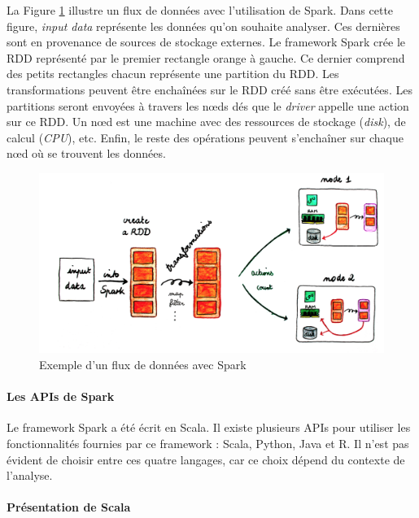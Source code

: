  La Figure 	\ref{fig:globalviewrdd} illustre un flux de données avec l'utilisation de Spark. Dans cette figure, \textit{input data} représente les données qu'on souhaite analyser. Ces dernières sont en provenance de sources de stockage externes. Le framework Spark crée le RDD représenté par le premier rectangle orange à gauche. Ce dernier  comprend  des petits rectangles chacun représente une partition du RDD.  Les transformations  peuvent être enchaînées sur le RDD créé sans être exécutées. Les partitions seront envoyées à travers les n\oe{}ds dés que le \textit{driver} appelle une action sur ce RDD. Un n\oe{}d est une machine avec des ressources de stockage (\textit{disk}), de calcul (\textit{CPU}), etc. Enfin, le reste des opérations peuvent s'enchaîner  sur chaque n\oe{}d où se trouvent les données.
 
\begin{figure}[H]
	\centering
	\captionsetup{justification= centering}
	\includegraphics[width=0.7\linewidth]{illustrations/global_view_rdd}
	\caption{Exemple d'un flux de données avec Spark}
	\label{fig:globalviewrdd}
\end{figure}



\paragraph{Les APIs de Spark}

Le framework Spark a été écrit en Scala.  Il existe plusieurs APIs pour utiliser les fonctionnalités fournies par ce framework : Scala, Python, Java et R. Il n'est pas évident de choisir entre ces quatre langages, car ce choix dépend du contexte de l'analyse. 





\paragraph{Présentation de Scala} \label{scala-presentation}

